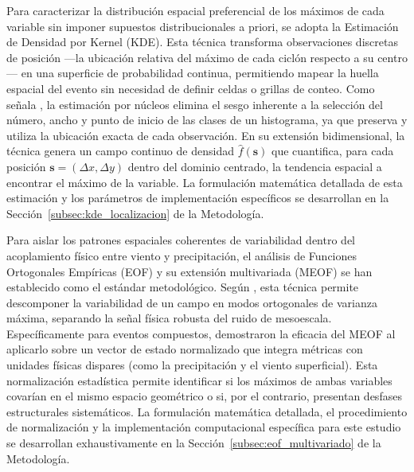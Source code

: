 Para caracterizar la distribución espacial preferencial de los máximos de cada variable sin imponer supuestos distribucionales a priori, se adopta la Estimación de Densidad por Kernel (KDE). Esta técnica transforma observaciones discretas de posición —la ubicación relativa del máximo de cada ciclón respecto a su centro— en una superficie de probabilidad continua, permitiendo mapear la huella espacial del evento sin necesidad de definir celdas o grillas de conteo. Como señala \citet{weglarczyk2018kernel}, la estimación por núcleos elimina el sesgo inherente a la selección del número, ancho y punto de inicio de las clases de un histograma, ya que preserva y utiliza la ubicación exacta de cada observación. En su extensión bidimensional, la técnica genera un campo continuo de densidad $\hat{f}(\mathbf{s})$ que cuantifica, para cada posición $\mathbf{s} = (\Delta x, \Delta y)$ dentro del dominio centrado, la tendencia espacial a encontrar el máximo de la variable. La formulación matemática detallada de esta estimación y los parámetros de implementación específicos se desarrollan en la Sección~\ref{subsec:kde_localizacion} de la Metodología.

Para aislar los patrones espaciales coherentes de variabilidad dentro del acoplamiento físico entre viento y precipitación, el análisis de Funciones Ortogonales Empíricas (EOF) y su extensión multivariada (MEOF) se han establecido como el estándar metodológico. Según \citet{hannachi2007empirical}, esta técnica permite descomponer la variabilidad de un campo en modos ortogonales de varianza máxima, separando la señal física robusta del ruido de mesoescala. Específicamente para eventos compuestos, \citet{liang2018multivariate} demostraron la eficacia del MEOF al aplicarlo sobre un vector de estado normalizado que integra métricas con unidades físicas dispares (como la precipitación y el viento superficial). Esta normalización estadística permite identificar si los máximos de ambas variables covarían en el mismo espacio geométrico o si, por el contrario, presentan desfases estructurales sistemáticos. La formulación matemática detallada, el procedimiento de normalización y la implementación computacional específica para este estudio se desarrollan exhaustivamente en la Sección~\ref{subsec:eof_multivariado} de la Metodología.


